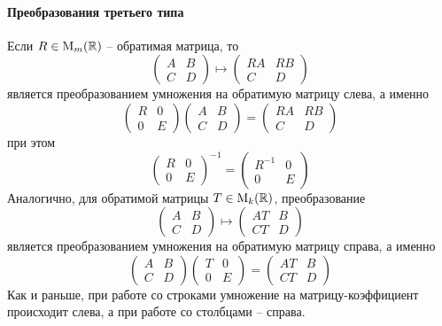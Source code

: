 \paragraph{Преобразования третьего типа}

Если $R\in \operatorname{M}_{m}(\mathbb R)$ -- обратимая матрица, то
\[
\begin{pmatrix}
{A}&{B}\\
{C}&{D}
\end{pmatrix}
\mapsto
\begin{pmatrix}
{RA}&{RB}\\
{C}&{D}
\end{pmatrix}
\]
является преобразованием умножения на обратимую матрицу слева, а именно
\[
\begin{pmatrix}
{R}&{0}\\
{0}&{E}
\end{pmatrix}
\begin{pmatrix}
{A}&{B}\\
{C}&{D}
\end{pmatrix}
=
\begin{pmatrix}
{RA}&{RB}\\
{C}&{D}
\end{pmatrix}
\]
при этом
\[
\begin{pmatrix}
{R}&{0}\\
{0}&{E}
\end{pmatrix}^{-1}
=
\begin{pmatrix}
{R^{-1}}&{0}\\
{0}&{E}
\end{pmatrix}
\]
Аналогично, для обратимой матрицы $T\in\operatorname{M}_{k}(\mathbb R)$, преобразование
\[
\begin{pmatrix}
{A}&{B}\\
{C}&{D}
\end{pmatrix}
\mapsto
\begin{pmatrix}
{AT}&{B}\\
{CT}&{D}
\end{pmatrix}
\]
является преобразованием умножения на обратимую матрицу справа, а именно
\[
\begin{pmatrix}
{A}&{B}\\
{C}&{D}
\end{pmatrix}
\begin{pmatrix}
{T}&{0}\\
{0}&{E}
\end{pmatrix}
=
\begin{pmatrix}
{AT}&{B}\\
{CT}&{D}
\end{pmatrix}
\]
Как и раньше, при работе со строками умножение на матрицу-коэффициент происходит слева, а при работе со столбцами -- справа.


